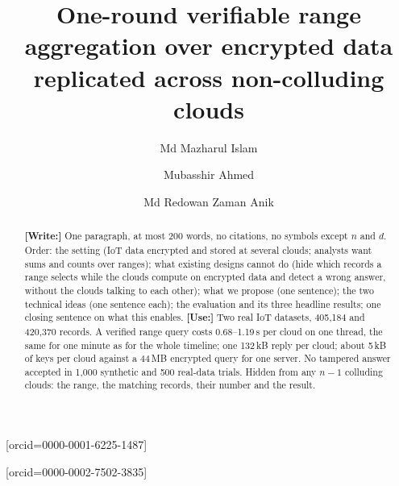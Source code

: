 \documentclass[a4paper,fleqn]{cas-sc}
\begin{document}
\let\WriteBookmarks\relax
\def\floatpagepagefraction{1}
\def\textpagefraction{.001}


\title[mode=title]{One-round verifiable range aggregation over encrypted data
replicated across non-colluding clouds}

\author[1]{Md Mazharul Islam}[orcid=0000-0001-6225-1487]
\cormark[1]

\author[1]{Mubasshir Ahmed}[orcid=0000-0002-7502-3835]

\author[1]{Md Redowan Zaman Anik}



\begin{abstract}
\textbf{[Write:]} One paragraph, at most 200 words, no citations, no symbols except $n$
and $d$. Order: the setting (IoT data encrypted and stored at several clouds;
analysts want sums and counts over ranges); what existing designs cannot do
(hide which records a range selects while the clouds compute on encrypted data
and detect a wrong answer, without the clouds talking to each other); what we
propose (one sentence); the two technical ideas (one sentence each); the
evaluation and its three headline results; one closing sentence on what this
enables. \textbf{[Use:]} Two real IoT datasets, 405{,}184 and 420{,}370 records. A verified
range query costs 0.68--1.19\,s per cloud on one thread, the same for one
minute as for the whole timeline; one 132\,kB reply per cloud; about 5\,kB of
keys per cloud against a 44\,MB encrypted query for one server. No tampered
answer accepted in 1{,}000 synthetic and 500 real-data trials. Hidden from any
$n-1$ colluding clouds: the range, the matching records, their number and the
result.
\end{abstract}
\end{document}
